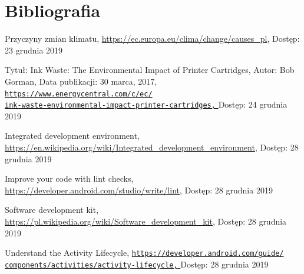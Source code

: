 \documentclass[a4paper,12pt, twoside]{article}
\begin{document}
       
        
    	\newpage
    	\section{Bibliografia}
    	
     	\begingroup
    	\renewcommand{\section}[2]{}
    	\begin{thebibliography}{}
    		
    		Przyczyny zmian klimatu,
    		\newline\url{https://ec.europa.eu/clima/change/causes\_pl}, 
    		\newline Dostęp: 23 grudnia 2019
    		
    		Tytuł: Ink Waste: The Environmental Impact of Printer Cartridges,\newline
    		Autor: Bob Gorman,\newline
    		Data publikacji: 30 marca, 2017,
    		\newline\href{https://www.energycentral.com/c/ec/ink-waste-environmental-impact-printer-cartridges}
    		 {\nolinkurl{https://www.energycentral.com/c/ec/}
                 \\
                  \nolinkurl{ink-waste-environmental-impact-printer-cartridges,}
                 }
    		\newline Dostęp: 24 grudnia 2019
    		
    		Integrated development environment,
    		\newline\url{https://en.wikipedia.org/wiki/Integrated_development_environment}, 
    		\newline Dostęp: 28 grudnia 2019
    		
    		Improve your code with lint checks,
    		\newline\url{https://developer.android.com/studio/write/lint}, 
    		\newline Dostęp: 28 grudnia 2019
    		
    		Software development kit,
    		\newline\url{https://pl.wikipedia.org/wiki/Software_development_kit}, 
    		\newline Dostęp: 28 grudnia 2019
    		
    		Understand the Activity Lifecycle,
    		\newline\href{https://developer.android.com/guide/components/activities/activity-lifecycle}
    		 {\nolinkurl{https://developer.android.com/guide/}
                 \\
                  \nolinkurl{components/activities/activity-lifecycle,}
                 }
    		\newline Dostęp: 28 grudnia 2019
    

\end{thebibliography}
\end{document}
